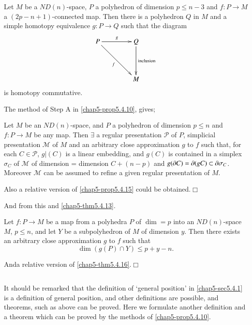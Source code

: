 \begin{theorem}\label{chap5-thm5.4.14}
Let $M$ be a $ND(n)$-space, $P$ a polyhedron of dimension $p\leq n-3$ and $f:P\to M$ a $(2p-n+1)$-connected map. Then there is a polyhedron $Q$ in $M$ and a simple homotopy equivalence $g:P\to Q$ such that the diagram
\[
\xymatrix@=1.5cm{
P\ar[r]^{g}\ar[dr]_{f} & Q\ar[d]^-{\text{\rm inclusion}}\\
 & M
}
\]
is homotopy commutative.
\end{theorem}

The method of Step A in \ref{chap5-prop5.4.10}, gives;

\begin{proposition}\label{chap5-prop5.4.15}
Let $M$ be an $ND(n)$-space, and $P$ a polyhedron of dimension $p\leq n$ and $f:P\to M$ be any map. Then $\exists$ a regular presentation $\mathscr{P}$ of $P$, simplicial presentation $\mathscr{M}$ of $M$ and an arbitrary close approximation $g$ to $f$ such that, for each $C\in \mathscr{P}$, $g|(C)$ is a linear embedding, and $g(C)$ is contained in a simplex $\sigma_{C}$ of $\mathscr{M}$ of dimension = dimension $C+(n-p)$ and $g(\partial C)=\partial (gC)\subset \partial \sigma_{C}$. Moreover $\mathscr{M}$ can be assumed to refine a given regular presentation of $M$. 
\end{proposition}

Also a relative version of \ref{chap5-prop5.4.15} could be obtained.\hfill$\Box$

And from this and \ref{chap5-thm5.4.13}.

\begin{theorem}\label{chap5-thm5.4.16}
Let $f:P\to M$ be a map from a polyhedra $P$ of $\dim =p$ into an $ND(n)$-space $M$, $p\leq n$, and let $Y$ be a subpolyhedron of $M$ of dimension $y$. Then there exists an arbitrary close approximation $g$ to $f$ such that
$$
\dim (g(P)\cap Y)\leq p+y-n.
$$
\end{theorem}

And\pageoriginale a relative version of \ref{chap5-thm5.4.16}.\hfill$\Box$

\setcounter{subsection}{16}
\subsection{}\label{chap5-sec5.4.17}
It should be remarked that the definition of `general position' in 
\ref{chap5-sec5.4.1} is a definition of general position, and other definitions are possible, and theorems, such as above can be proved. Here we formulate another definition and a theorem which can be proved by the methods of \ref{chap5-prop5.4.10}.

